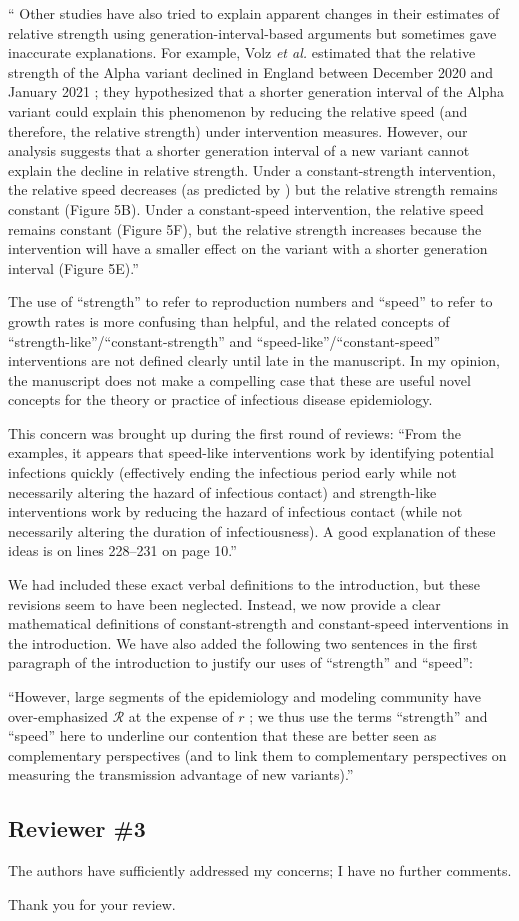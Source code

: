 \documentclass[12pt]{article}
\newcommand{\RR}{\ensuremath{{\mathcal R}}\xspace}
\newcommand{\rev}{\subsection*}
\newcommand{\revtext}{\textsf}
\begin{document}
``
Other studies have also tried to explain apparent changes in their estimates of relative strength using generation-interval-based arguments but sometimes gave inaccurate explanations. 
For example, Volz \textit{et al.} estimated that the relative strength of the Alpha variant declined in England between December 2020 and January 2021 \cite{volz2021transmission};
they hypothesized that a shorter generation interval of the Alpha variant could explain this phenomenon by reducing the relative speed (and therefore, the relative strength) under intervention measures.
However, our analysis suggests that a shorter generation interval of a new variant cannot explain the decline in relative strength.
Under a constant-strength intervention, the relative speed decreases (as predicted by  \cite{volz2021transmission}) but the relative strength remains constant (Figure 5B). 
Under a constant-speed intervention, the relative speed remains constant (Figure 5F), but the relative strength increases because the intervention will have a smaller effect on the variant with a shorter generation interval (Figure 5E).''

\revtext{The use of ``strength'' to refer to reproduction numbers and ``speed'' to refer to growth rates is more confusing than helpful, and the related concepts of ``strength-like''/``constant-strength'' and ``speed-like''/``constant-speed'' interventions are not defined clearly until late in the manuscript. In my opinion, the manuscript does not make a compelling case that these are useful novel concepts for the theory or practice of infectious disease epidemiology.}

This concern was brought up during the first round of reviews: ``From the examples, it appears that
speed-like interventions work by identifying potential infections quickly
(effectively ending the infectious period early while not necessarily altering
the hazard of infectious contact) and strength-like interventions work by
reducing the hazard of infectious contact (while not necessarily altering
the duration of infectiousness). A good explanation of these ideas is on
lines 228–231 on page 10.''

We had included these exact verbal definitions to the introduction, but these revisions seem to have been neglected. Instead, we now provide a clear mathematical definitions of constant-strength and constant-speed interventions in the introduction. We have also added the following two sentences in the first paragraph of the introduction to justify our uses of ``strength'' and ``speed'':

``However, large segments of the epidemiology and modeling community have over-emphasized $\RR$ at the expense of $r$ \citep{doi:10.1098/rspb.2020.1556};
we thus use the terms ``strength'' and ``speed''  here to underline our contention that these are better seen as complementary perspectives (and to link them to complementary perspectives on measuring the transmission advantage of new variants).''

\rev{Reviewer \#3}

\revtext{The authors have sufficiently addressed my concerns; I have no further comments.}

Thank you for your review.


\end{document}
